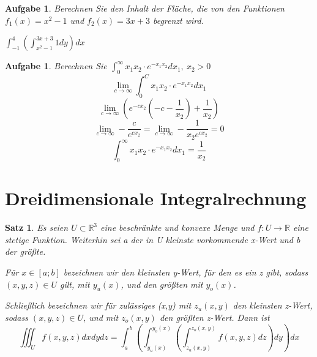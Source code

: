 \documentclass[fontset=ubuntu,12pt,a4paper]{scrreprt}
\newtheorem{satz}[defi]{Satz}
\newtheorem{aufg}[defi]{Aufgabe}
\begin{document}
    \begin{aufg}
        Berechnen Sie den Inhalt der Fläche, die von den Funktionen \(f_1(x)=x^2-1\) und \(f_2(x)=3x+3\) begrenzt wird.
        \\

        \(\int_{-1}^4 \left(\int_{x^2-1}^{3x+3} 1dy\right)dx\)
    \end{aufg}

    \begin{aufg}
        Berechnen Sie \(\int_0^\infty x_1 x_2 \cdot e^{-x_1 x_2}dx_1,\ x_2>0\)
        \[\lim_{c\to\infty} \int_0^C x_1 x_2 \cdot e^{-x_1 x_2}dx_1\]
        \[\lim_{c\to\infty} \left(e^{-cx_2}\left(-c-\frac{1}{x_2}\right)+\frac{1}{x_2} \right)\]
        \[\lim_{c\to\infty} -\frac{c}{e^{cx_2}}=\lim_{c\to\infty} -\frac{1}{x_2e^{cx_2}}=0 \]
        \[\int_0^\infty x_1 x_2 \cdot e^{-x_1 x_2}dx_1=\frac{1}{x_2}\]
    \end{aufg}

    \section{Dreidimensionale Integralrechnung}

    \begin{satz}
        Es seien \(U\subset\mathbb{R}^3\) eine beschränkte und konvexe Menge und \(f:U\to\mathbb{R}\) eine stetige Funktion. Weiterhin sei a der in U kleinste vorkommende x-Wert und b der größte.

        Für \(x\in[a;b]\) bezeichnen wir den kleinsten y-Wert, für den es ein z gibt, sodass \((x,y,z)\in U\) gilt, mit \(y_u(x)\), und den größten mit \(y_o(x)\).

        Schließlich bezeichnen wir für zulässiges (x,y) mit \(z_u(x,y)\) den kleinsten z-Wert, sodass \((x,y,z)\in U\), und mit \(z_o(x,y)\) den größten z-Wert. Dann ist
        \[\iiint_U f(x,y,z)dxdydz=\int_a^b \left(\int_{y_u(x)}^{y_o(x)} \left(\int_{z_u(x,y)}^{z_o(x,y)} f(x,y,z)dz\right)dy\right)dx\]
    \end{satz}
\end{document}
